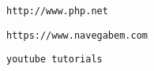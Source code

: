 \begin{thebibliography}{99}

	\normalsize
	
	
	
	\bibitem{} {}
	\texttt{http://www.php.net}

     \bibitem{}	{}
	 \texttt{https://www.navegabem.com}
	 
	 
	 \bibitem{}{}
	 \texttt{youtube tutorials}
	 
	 
\end{thebibliography}
